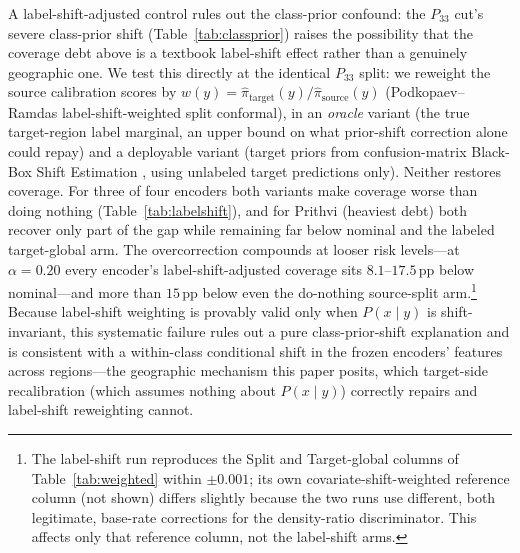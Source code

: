 \documentclass[journal]{IEEEtran}
\renewcommand{\_}{\textunderscore\allowbreak}
\begin{document}
A label-shift-adjusted control rules out the class-prior confound: the $P_{33}$ cut's
severe class-prior shift (Table~\ref{tab:classprior}) raises the possibility that the
coverage debt above is a textbook label-shift effect \citep{podkopaev2021labelshift} rather than a
genuinely geographic one. We test this directly at the identical $P_{33}$ split: we reweight the
source calibration scores by $w(y)=\hat\pi_{\text{target}}(y)/\hat\pi_{\text{source}}(y)$
(Podkopaev--Ramdas label-shift-weighted split conformal), in an \emph{oracle} variant (the true
target-region label marginal, an upper bound on what prior-shift correction alone could repay) and a
deployable variant (target priors from confusion-matrix Black-Box Shift Estimation
\citep{lipton2018bbse}, using unlabeled target predictions only). Neither restores
coverage. For three of four encoders both variants make coverage worse than doing nothing
(Table~\ref{tab:labelshift}), and for Prithvi (heaviest debt) both recover only part of the gap
while remaining far below nominal and the labeled target-global arm. The overcorrection compounds at
looser risk levels---at $\alpha=0.20$ every encoder's
label-shift-adjusted coverage sits $8.1$--$17.5$\,pp below nominal---and more than $15$\,pp below
even the do-nothing source-split arm.\footnote{The label-shift run reproduces the Split and Target-global columns of
Table~\ref{tab:weighted} within $\pm0.001$; its own covariate-shift-weighted reference column (not
shown) differs slightly because the two runs use different, both legitimate, base-rate corrections
for the density-ratio discriminator. This affects only that reference column, not the label-shift
arms.} Because label-shift weighting is
provably valid only when $P(x\mid y)$ is shift-invariant, this systematic failure rules out a pure
class-prior-shift explanation and is consistent with a within-class conditional shift in the frozen
encoders' features across regions---the geographic mechanism this paper posits, which target-side
recalibration (which assumes nothing about $P(x\mid y)$) correctly repairs and label-shift reweighting
cannot.
\end{document}
